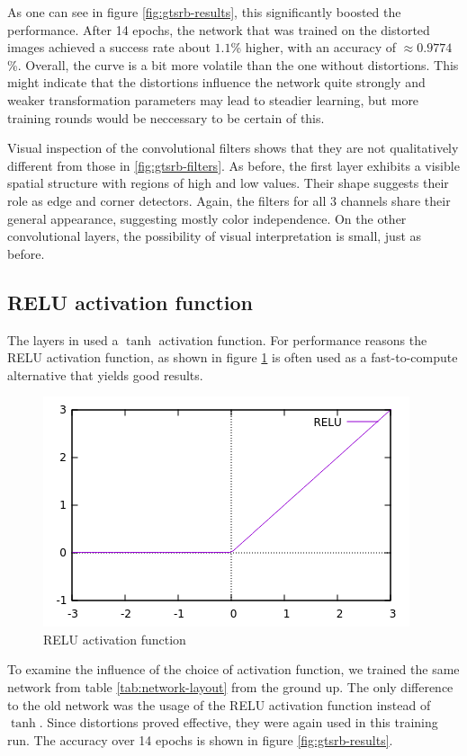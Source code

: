 \documentclass[11pt, a4paper]{article}
\begin{document}
As one can see in figure \ref{fig:gtsrb-results}, this significantly boosted the performance. After 14 epochs, the network that was trained on the distorted images achieved a success rate about $1.1$\% higher, with an accuracy of $\approx 0.9774$\%. Overall, the curve is a bit more volatile than the one without distortions. This might indicate that the distortions influence the network quite strongly and weaker transformation parameters may lead to steadier learning, but more training rounds would be neccessary to be certain of this.

Visual inspection of the convolutional filters shows that they are not qualitatively different from those in \ref{fig:gtsrb-filters}. As before, the first layer exhibits a visible spatial structure with regions of high and low values. Their shape suggests their role as edge and corner detectors. Again, the filters for all 3 channels share their general appearance, suggesting mostly color independence. On the other convolutional layers, the possibility of visual interpretation is small, just as before.

\subsection{RELU activation function}
The layers in \cite{multi-column-neural-network-gtsrb} used a $\tanh$ activation function. For performance reasons the RELU activation function, as shown in figure \ref{fig:relu} is often used as a fast-to-compute alternative that yields good results.

\begin{figure}[h!!!]
	\centering
	\includegraphics{images/relu.png}
	\caption{RELU activation function}
	\label{fig:relu}
\end{figure}

To examine the influence of the choice of activation function, we trained the same network from table \ref{tab:network-layout} from the ground up. The only difference to the old network was the usage of the RELU activation function instead of $\tanh$. Since distortions proved effective, they were again used in this training run. The accuracy over 14 epochs is shown in figure \ref{fig:gtsrb-results}.
\end{document}
